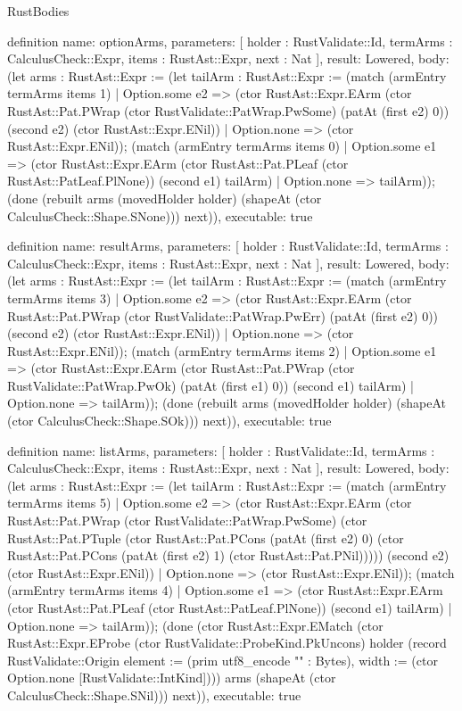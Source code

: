 \begin{lexlean}{RustBodies}
\begin{semanticmodule}
definition{
  name: optionArms,
  parameters: [
    holder : RustValidate::Id,
    termArms : CalculusCheck::Expr,
    items : RustAst::Expr,
    next : Nat
  ],
  result: Lowered,
  body: (let arms : RustAst::Expr := (let tailArm : RustAst::Expr := (match (armEntry termArms items 1)
    | Option.some e2 => (ctor RustAst::Expr.EArm (ctor RustAst::Pat.PWrap (ctor RustValidate::PatWrap.PwSome) (patAt (first e2) 0)) (second e2) (ctor RustAst::Expr.ENil))
    | Option.none => (ctor RustAst::Expr.ENil)); (match (armEntry termArms items 0)
    | Option.some e1 => (ctor RustAst::Expr.EArm (ctor RustAst::Pat.PLeaf (ctor RustAst::PatLeaf.PlNone)) (second e1) tailArm)
    | Option.none => tailArm)); (done (rebuilt arms (movedHolder holder) (shapeAt (ctor CalculusCheck::Shape.SNone))) next)),
  executable: true
}

definition{
  name: resultArms,
  parameters: [
    holder : RustValidate::Id,
    termArms : CalculusCheck::Expr,
    items : RustAst::Expr,
    next : Nat
  ],
  result: Lowered,
  body: (let arms : RustAst::Expr := (let tailArm : RustAst::Expr := (match (armEntry termArms items 3)
    | Option.some e2 => (ctor RustAst::Expr.EArm (ctor RustAst::Pat.PWrap (ctor RustValidate::PatWrap.PwErr) (patAt (first e2) 0)) (second e2) (ctor RustAst::Expr.ENil))
    | Option.none => (ctor RustAst::Expr.ENil)); (match (armEntry termArms items 2)
    | Option.some e1 => (ctor RustAst::Expr.EArm (ctor RustAst::Pat.PWrap (ctor RustValidate::PatWrap.PwOk) (patAt (first e1) 0)) (second e1) tailArm)
    | Option.none => tailArm)); (done (rebuilt arms (movedHolder holder) (shapeAt (ctor CalculusCheck::Shape.SOk))) next)),
  executable: true
}

definition{
  name: listArms,
  parameters: [
    holder : RustValidate::Id,
    termArms : CalculusCheck::Expr,
    items : RustAst::Expr,
    next : Nat
  ],
  result: Lowered,
  body: (let arms : RustAst::Expr := (let tailArm : RustAst::Expr := (match (armEntry termArms items 5)
    | Option.some e2 => (ctor RustAst::Expr.EArm (ctor RustAst::Pat.PWrap (ctor RustValidate::PatWrap.PwSome) (ctor RustAst::Pat.PTuple (ctor RustAst::Pat.PCons (patAt (first e2) 0) (ctor RustAst::Pat.PCons (patAt (first e2) 1) (ctor RustAst::Pat.PNil))))) (second e2) (ctor RustAst::Expr.ENil))
    | Option.none => (ctor RustAst::Expr.ENil)); (match (armEntry termArms items 4)
    | Option.some e1 => (ctor RustAst::Expr.EArm (ctor RustAst::Pat.PLeaf (ctor RustAst::PatLeaf.PlNone)) (second e1) tailArm)
    | Option.none => tailArm)); (done (ctor RustAst::Expr.EMatch (ctor RustAst::Expr.EProbe (ctor RustValidate::ProbeKind.PkUncons) holder (record RustValidate::Origin {element := (prim utf8_encode "" : Bytes), width := (ctor Option.none [RustValidate::IntKind])})) arms (shapeAt (ctor CalculusCheck::Shape.SNil))) next)),
  executable: true
}


\end{semanticmodule}
\end{lexlean}
